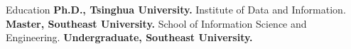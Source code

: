 

\begin{rubric}{Education}  
\entry*[2022 -- 2026]%
	\textbf{Ph.D., Tsinghua University.} Institute of Data and Information.  
\entry*[2014 -- 2021]%
	\textbf{Master, Southeast University.} School of Information Science and Engineering.
%  
\entry*[2014 -- 2021]%
	\textbf{Undergraduate, Southeast University.}   
%  
\end{rubric}

